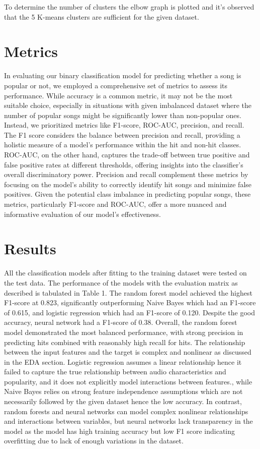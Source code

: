 \documentclass{article}
\begin{document}
To determine the number of clusters the elbow graph is plotted and it's observed that the 5 K-means clusters are sufficient for the given dataset.

 
\section{Metrics}
In evaluating our binary classification model for predicting whether a song is popular or not, we employed a comprehensive set of metrics to assess its performance. While accuracy is a common metric, it may not be the most suitable choice, especially in situations with given imbalanced dataset where the number of popular songs might be significantly lower than non-popular ones. Instead, we prioritized metrics like F1-score, ROC-AUC, precision, and recall. The F1 score considers the balance between precision and recall, providing a holistic measure of a model's performance within the hit and non-hit classes. ROC-AUC, on the other hand, captures the trade-off between true positive and false positive rates at different thresholds, offering insights into the classifier's overall discriminatory power. Precision and recall complement these metrics by focusing on the model's ability to correctly identify hit songs and minimize false positives. Given the potential class imbalance in predicting popular songs, these metrics, particularly F1-score and ROC-AUC, offer a more nuanced and informative evaluation of our model's effectiveness.

\section{Results}
All the classification models after fitting to the training dataset were tested on the test data. The performance of the models with the evaluation matrix as described is tabulated in Table 1. The random forest model achieved the highest F1-score at 0.823, significantly outperforming Naive Bayes which had an F1-score of 0.615, and logistic regression which had an F1-score of 0.120. Despite the good accuracy, neural network had a F1-score of 0.38. Overall, the random forest model demonstrated the most balanced performance, with strong precision in predicting hits combined with reasonably high recall for hits. The relationship between the input features and the target is complex and nonlinear as discussed in the EDA section. Logistic regression assumes a linear relationship hence it failed to capture the true relationship between audio characteristics and popularity, and it does not explicitly model interactions between features., while Naive Bayes relies on strong feature independence assumptions which are not necessarily followed by the given dataset hence the low accuracy. In contrast, random forests and neural networks can model complex nonlinear relationships and interactions between variables, but neural networks lack transparency in the model as the model has high training accuracy but low F1 score indicating overfitting due to lack of enough variations in the dataset. 
\end{document}
